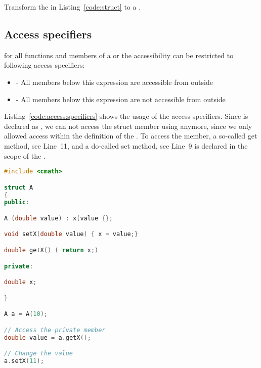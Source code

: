 \begin{exercise}
Transform the  in Listing~\ref{code:struct} to a .
\end{exercise}

\subsection{Access specifiers}
\label{sec:access:specifiers}
for all functions and members of a  or  the accessibility can be restricted to following access specifiers:
\begin{itemize}
\item {} - All members below this expression are accessible from outside 
\item {} - All members below this expression are not accessible from outside
\end{itemize}
\vspace{0.25cm}
Listing~\ref{code:access:specifiers} shows the usage of the access specifiers. Since  is declared as , we can not access the struct member using  anymore, since we only allowed access within the definition of the . To access the  member, a so-called get method, see Line~11, and a do-called set method, see Line~9 is declared in the  scope of the .

\begin{lstlisting}[language=c++,caption={Example for a access specifiers.\label{code:access:specifiers}},float,floatplacement=tb]
#include <cmath>

struct A 
{
public:

A (double value) : x(value {};

void setX(double value) { x = value;}

double getX() ( return x;)

private:

double x;

}

A a = A(10);

// Access the private member
double value = a.getX();

// Change the value
a.setX(11);
\end{lstlisting}


